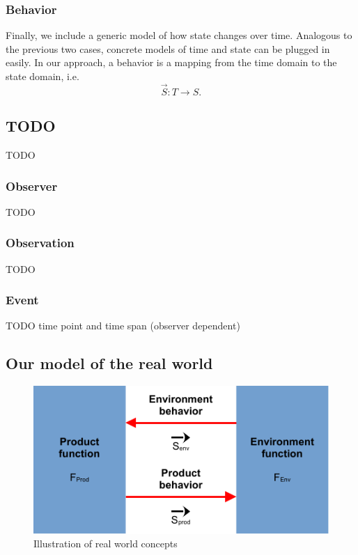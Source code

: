 \documentclass[conference]{IEEEtran}
\begin{document}
    \subsubsection{Behavior}
    Finally, we include a generic model of how state changes over time.
    Analogous to the previous two cases, concrete models of time and state can be plugged in easily.
    In our approach, a behavior is a mapping from the time domain to the state domain, i.e.
    \[
        \overrightarrow{S}: T \rightarrow S.
    \]

    \subsection{TODO}
    TODO

    \subsubsection{Observer}
    TODO

    \subsubsection{Observation}
    TODO

    \subsubsection{Event}
    TODO time point and time span (observer dependent)

    \subsection{Our model of the real world}
    \label{section:theory-world}

    \begin{figure}[htbp]
        \centering
        \includegraphics{./figures/theory-world.pdf}
        \caption{Illustration of real world concepts}
        \label{figure:theory-world}
    \end{figure}
\end{document}
